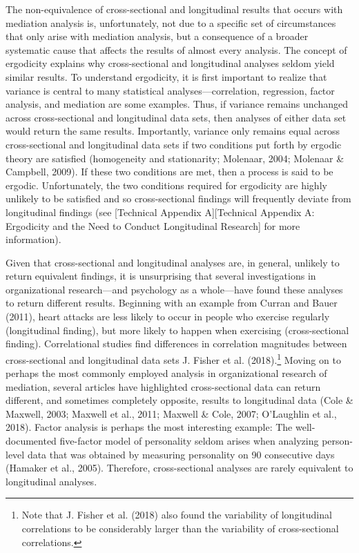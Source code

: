 \documentclass[
  english,
  man,floatsintext]{apa7}
\begin{document}
The non-equivalence of cross-sectional and longitudinal results that occurs with mediation analysis is, unfortunately, not due to a specific set of circumstances that only arise with mediation analysis, but a consequence of a broader systematic cause that affects the results of almost every analysis. The concept of ergodicity explains why cross-sectional and longitudinal analyses seldom yield similar results. To understand ergodicity, it is first important to realize that variance is central to many statistical analyses---correlation, regression, factor analysis, and mediation are some examples. Thus, if variance remains unchanged across cross-sectional and longitudinal data sets, then analyses of either data set would return the same results. Importantly, variance only remains equal across cross-sectional and longitudinal data sets if two conditions put forth by ergodic theory are satisfied (homogeneity and stationarity; Molenaar, 2004; Molenaar \& Campbell, 2009). If these two conditions are met, then a process is said to be ergodic. Unfortunately, the two conditions required for ergodicity are highly unlikely to be satisfied and so cross-sectional findings will frequently deviate from longitudinal findings (see {[}Technical Appendix A{]}{[}Technical Appendix A: Ergodicity and the Need to Conduct Longitudinal Research{]} for more information).



Given that cross-sectional and longitudinal analyses are, in general, unlikely to return equivalent findings, it is unsurprising that several investigations in organizational research---and psychology as a whole---have found these analyses to return different results. Beginning with an example from Curran and Bauer (2011), heart attacks are less likely to occur in people who exercise regularly (longitudinal finding), but more likely to happen when exercising (cross-sectional finding). Correlational studies find differences in correlation magnitudes between cross-sectional and longitudinal data sets J. Fisher et al. (2018).\footnote{Note that J. Fisher et al. (2018) also found the variability of longitudinal correlations to be considerably larger than the variability of cross-sectional correlations.} Moving on to perhaps the most commonly employed analysis in organizational research of mediation, several articles have highlighted cross-sectional data can return different, and sometimes completely opposite, results to longitudinal data (Cole \& Maxwell, 2003; Maxwell et al., 2011; Maxwell \& Cole, 2007; O'Laughlin et al., 2018). Factor analysis is perhaps the most interesting example: The well-documented five-factor model of personality seldom arises when analyzing person-level data that was obtained by measuring personality on 90 consecutive days (Hamaker et al., 2005). Therefore, cross-sectional analyses are rarely equivalent to longitudinal analyses.
\end{document}
